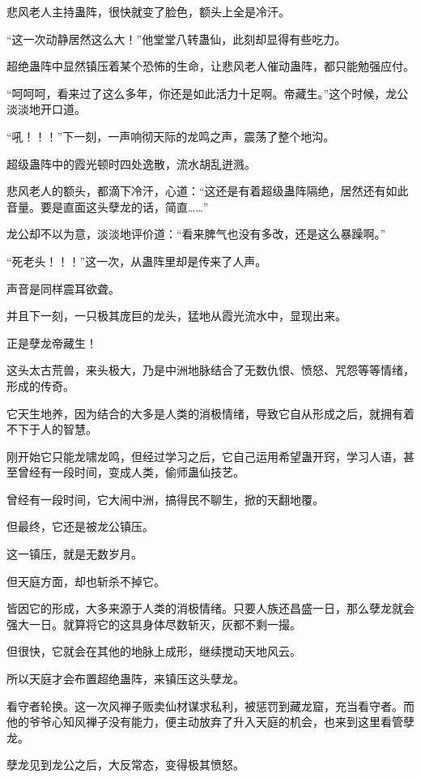 \begin{this_body}
悲风老人主持蛊阵，很快就变了脸色，额头上全是冷汗。

“这一次动静居然这么大！”他堂堂八转蛊仙，此刻却显得有些吃力。

超绝蛊阵中显然镇压着某个恐怖的生命，让悲风老人催动蛊阵，都只能勉强应付。

“呵呵呵，看来过了这么多年，你还是如此活力十足啊。帝藏生。”这个时候，龙公淡淡地开口道。

“吼！！！”下一刻，一声响彻天际的龙鸣之声，震荡了整个地沟。

超级蛊阵中的霞光顿时四处逸散，流水胡乱迸溅。

悲风老人的额头，都滴下冷汗，心道：“这还是有着超级蛊阵隔绝，居然还有如此音量。要是直面这头孽龙的话，简直……”

龙公却不以为意，淡淡地评价道：“看来脾气也没有多改，还是这么暴躁啊。”

“死老头！！！”这一次，从蛊阵里却是传来了人声。

声音是同样震耳欲聋。

并且下一刻，一只极其庞巨的龙头，猛地从霞光流水中，显现出来。

正是孽龙帝藏生！

这头太古荒兽，来头极大，乃是中洲地脉结合了无数仇恨、愤怒、咒怨等等情绪，形成的传奇。

它天生地养，因为结合的大多是人类的消极情绪，导致它自从形成之后，就拥有着不下于人的智慧。

刚开始它只能龙啸龙鸣，但经过学习之后，它自己运用希望蛊开窍，学习人语，甚至曾经有一段时间，变成人类，偷师蛊仙技艺。

曾经有一段时间，它大闹中洲，搞得民不聊生，掀的天翻地覆。

但最终，它还是被龙公镇压。

这一镇压，就是无数岁月。

但天庭方面，却也斩杀不掉它。

皆因它的形成，大多来源于人类的消极情绪。只要人族还昌盛一日，那么孽龙就会强大一日。就算将它的这具身体尽数斩灭，灰都不剩一撮。

但很快，它就会在其他的地脉上成形，继续搅动天地风云。

所以天庭才会布置超绝蛊阵，来镇压这头孽龙。

看守者轮换。这一次风禅子贩卖仙材谋求私利，被惩罚到藏龙窟，充当看守者。而他的爷爷心知风禅子没有能力，便主动放弃了升入天庭的机会，也来到这里看管孽龙。

孽龙见到龙公之后，大反常态，变得极其愤怒。


\end{this_body}
